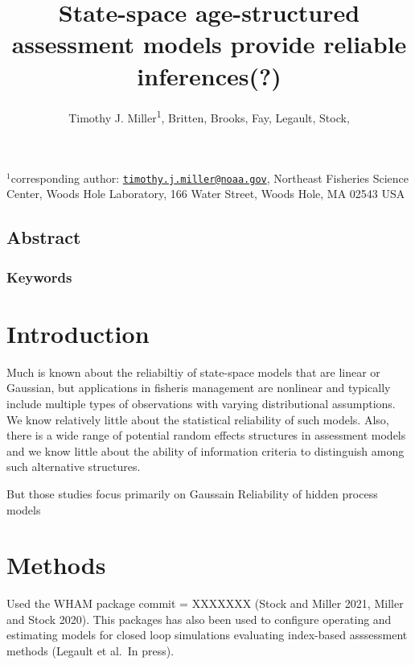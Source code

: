 \documentclass[
  12pt,
]{article}
\title{State-space age-structured assessment models provide reliable
inferences(?)}
\author{Timothy J. Miller\textsuperscript{1}, Britten, Brooks, Fay,
Legault, Stock,}
\date{}
\begin{document}
\maketitle

\(^1\)corresponding author:
\href{mailto:timothy.j.miller@noaa.gov}{\nolinkurl{timothy.j.miller@noaa.gov}},
Northeast Fisheries Science Center, Woods Hole Laboratory, 166 Water
Street, Woods Hole, MA 02543 USA\\

\pagebreak

\hypertarget{abstract}{%
\subsection*{Abstract}\label{abstract}}

\hypertarget{keywords}{%
\subsubsection*{Keywords}\label{keywords}}

\pagebreak

\hypertarget{introduction}{%
\section{Introduction}\label{introduction}}

Much is known about the reliabiltiy of state-space models that are
linear or Gaussian, but applications in fisheris management are
nonlinear and typically include multiple types of observations with
varying distributional assumptions. We know relatively little about the
statistical reliability of such models. Also, there is a wide range of
potential random effects structures in assessment models and we know
little about the ability of information criteria to distinguish among
such alternative structures.

But those studies focus primarily on Gaussain Reliability of hidden
process models

\hypertarget{methods}{%
\section{Methods}\label{methods}}

Used the WHAM package commit = XXXXXXX (Stock and Miller 2021, Miller
and Stock 2020). This packages has also been used to configure operating
and estimating models for closed loop simulations evaluating index-based
asssessment methods (Legault et al.~In press).
\end{document}
